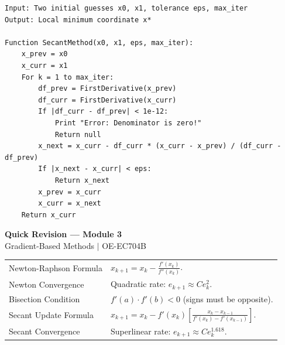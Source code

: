 \documentclass[12pt,a4paper]{article}
\renewcommand{\arraystretch}{1.45}
\begin{document}
\begin{tcolorbox}[tikzbox, title={Secant Optimization Pseudo-code}]
\begin{spacing}{1.1}
\begin{verbatim}
Input: Two initial guesses x0, x1, tolerance eps, max_iter
Output: Local minimum coordinate x*

Function SecantMethod(x0, x1, eps, max_iter):
    x_prev = x0
    x_curr = x1
    For k = 1 to max_iter:
        df_prev = FirstDerivative(x_prev)
        df_curr = FirstDerivative(x_curr)
        If |df_curr - df_prev| < 1e-12:
            Print "Error: Denominator is zero!"
            Return null
        x_next = x_curr - df_curr * (x_curr - x_prev) / (df_curr - df_prev)
        If |x_next - x_curr| < eps:
            Return x_next
        x_prev = x_curr
        x_curr = x_next
    Return x_curr
\end{verbatim}
\end{spacing}
\end{tcolorbox}

\newpage

\begin{center}
  {\large\bfseries\color{myred} Quick Revision --- Module 3}\\[3pt]
  {\small\color{mydark} Gradient-Based Methods $|$ OE-EC704B}
\end{center}
\noindent{\color{myred}\rule{\linewidth}{1.2pt}}
\vspace{4pt}

\begin{tcolorbox}[formulabox, title={\textbf{Key Formulas \& Convergence Rates}}]
\renewcommand{\arraystretch}{1.45}
\begin{tabularx}{\linewidth}{B{5.0cm} X}
Newton-Raphson Formula & $x_{k+1} = x_k - \frac{f'(x_k)}{f''(x_k)}$. \\[4pt]
Newton Convergence & Quadratic rate: $e_{k+1} \approx C e_k^2$. \\[4pt]
Bisection Condition & $f'(a) \cdot f'(b) < 0$ \quad (signs must be opposite). \\[4pt]
Secant Update Formula & $x_{k+1} = x_k - f'(x_k) \left[ \frac{x_k - x_{k-1}}{f'(x_k) - f'(x_{k-1})} \right]$. \\[4pt]
Secant Convergence & Superlinear rate: $e_{k+1} \approx C e_k^{1.618}$. \\
\end{tabularx}
\end{tcolorbox}
\end{document}
